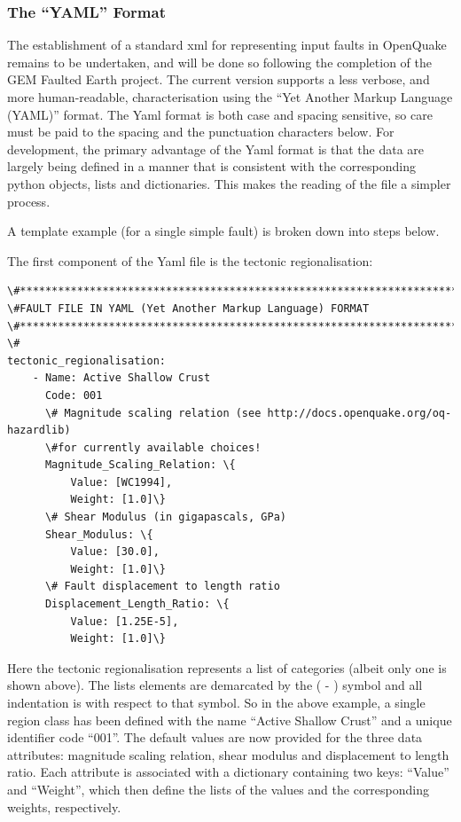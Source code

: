 \subsubsection{The ``YAML'' Format}

The establishment of a standard xml for representing input faults in OpenQuake remains to be undertaken, and will be done so following the completion of the GEM Faulted Earth project. The current version supports a less verbose, and more human-readable, characterisation using the ``Yet Another Markup Language (YAML)'' format. The Yaml format is both case and spacing sensitive, so care must be paid to the spacing and the punctuation characters below. For development, the primary advantage of the Yaml format
is that the data are largely being defined in a manner that is consistent with the 
corresponding python objects, lists and dictionaries. This makes the reading of the file a simpler process. 

A template example (for a single simple fault) is broken down into steps below.

The first component of the Yaml file is the tectonic regionalisation:

\begin{Verbatim}[frame=single, commandchars=\\\{\}, fontsize=\scriptsize]
\#*****************************************************************************
\#FAULT FILE IN YAML (Yet Another Markup Language) FORMAT
\#*****************************************************************************
\#
tectonic_regionalisation:
    - Name: Active Shallow Crust
      Code: 001
      \# Magnitude scaling relation (see http://docs.openquake.org/oq-hazardlib)
      \#for currently available choices!
      Magnitude_Scaling_Relation: \{
          Value: [WC1994],
          Weight: [1.0]\}
      \# Shear Modulus (in gigapascals, GPa)
      Shear_Modulus: \{
          Value: [30.0],
          Weight: [1.0]\}
      \# Fault displacement to length ratio
      Displacement_Length_Ratio: \{
          Value: [1.25E-5],
          Weight: [1.0]\}
\end{Verbatim}

Here the tectonic regionalisation represents a list of categories (albeit only one is shown above). The lists elements are demarcated by the ( - ) symbol and all indentation is with respect to that symbol. So in the above example, a single region class has been defined with the name ``Active Shallow Crust'' and a unique identifier code ``001''. The default values are now provided for the three data attributes: magnitude scaling relation, shear modulus and displacement to length ratio. Each attribute is associated with a dictionary containing two keys: ``Value'' and ``Weight'', which then define the lists of the values and the corresponding weights, respectively.

